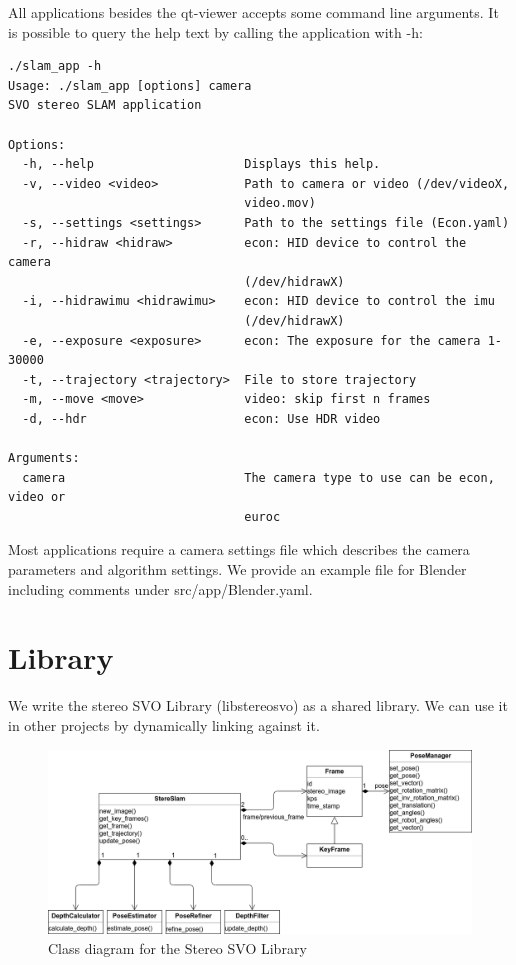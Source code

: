 \documentclass[11pt,a4paper,titlepage,oneside]{report}
\begin{document}
All applications besides the qt-viewer accepts some command line arguments. It is possible to query the help text by calling the application with -h:\\
\begin{lstlisting}
./slam_app -h
Usage: ./slam_app [options] camera
SVO stereo SLAM application

Options:
  -h, --help                     Displays this help.
  -v, --video <video>            Path to camera or video (/dev/videoX,
                                 video.mov)
  -s, --settings <settings>      Path to the settings file (Econ.yaml)
  -r, --hidraw <hidraw>          econ: HID device to control the camera
                                 (/dev/hidrawX)
  -i, --hidrawimu <hidrawimu>    econ: HID device to control the imu
                                 (/dev/hidrawX)
  -e, --exposure <exposure>      econ: The exposure for the camera 1-30000
  -t, --trajectory <trajectory>  File to store trajectory
  -m, --move <move>              video: skip first n frames
  -d, --hdr                      econ: Use HDR video

Arguments:
  camera                         The camera type to use can be econ, video or
                                 euroc
\end{lstlisting}

Most applications require a camera settings file which describes the camera parameters and algorithm settings. We provide an example file for Blender including comments under src/app/Blender.yaml.

\section{Library}

We write the stereo SVO Library (libstereosvo) as a shared library. We can use it in other projects by dynamically linking against it.
\begin{figure}[H]
  \centering
  \includegraphics[width=1.0\textwidth]{img/class_diagram.png}
  \caption{Class diagram for the Stereo SVO Library}\label{fig:class_diagram}
\end{figure}
\end{document}
